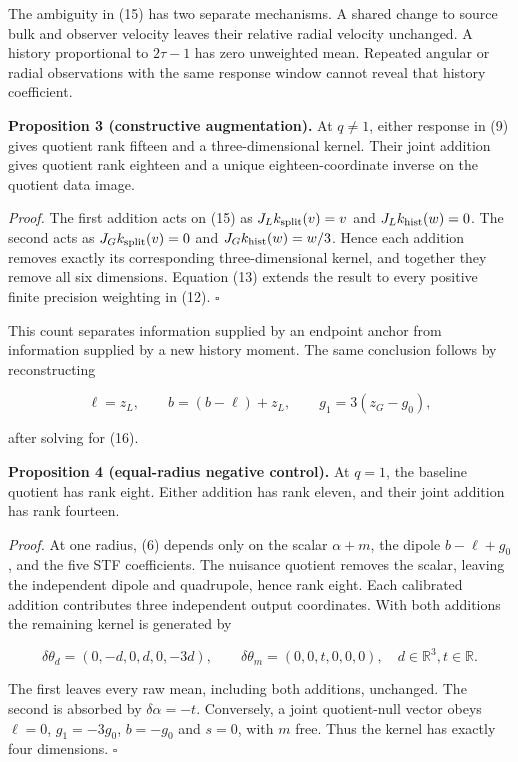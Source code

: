 The ambiguity in (15) has two separate mechanisms. A shared change to source bulk and observer velocity leaves their relative radial velocity unchanged. A history proportional to \(2\tau-1\) has zero unweighted mean. Repeated angular or radial observations with the same response window cannot reveal that history coefficient.

\textbf{Proposition 3 (constructive augmentation).} At \(q\ne1\), either response in (9) gives quotient rank fifteen and a three-dimensional kernel. Their joint addition gives quotient rank eighteen and a unique eighteen-coordinate inverse on the quotient data image.

\emph{Proof.} The first addition acts on (15) as \(J_Lk_{\rm split}(v)=v\) and \(J_Lk_{\rm hist}(w)=0\). The second acts as \(J_Gk_{\rm split}(v)=0\) and \(J_Gk_{\rm hist}(w)=w/3\). Hence each addition removes exactly its corresponding three-dimensional kernel, and together they remove all six dimensions. Equation (13) extends the result to every positive finite precision weighting in (12). \(\square\)

This count separates information supplied by an endpoint anchor from information supplied by a new history moment. The same conclusion follows by reconstructing

\[
\ell=z_L,\qquad b=(b-\ell)+z_L,\qquad
g_1=3(z_G-g_0),                                         \tag{17}
\]

after solving for (16).

\textbf{Proposition 4 (equal-radius negative control).} At \(q=1\), the baseline quotient has rank eight. Either addition has rank eleven, and their joint addition has rank fourteen.

\emph{Proof.} At one radius, (6) depends only on the scalar \(\alpha+m\), the dipole \(b-\ell+g_0\), and the five STF coefficients. The nuisance quotient removes the scalar, leaving the independent dipole and quadrupole, hence rank eight. Each calibrated addition contributes three independent output coordinates. With both additions the remaining kernel is generated by

\[
\delta\theta_d=(0,-d,0,d,0,-3d),\qquad
\delta\theta_m=(0,0,t,0,0,0),\quad d\in\mathbb R^3, t\in\mathbb R.
                                                               \tag{18}
\]

The first leaves every raw mean, including both additions, unchanged. The second is absorbed by \(\delta\alpha=-t\). Conversely, a joint quotient-null vector obeys \(\ell=0\), \(g_1=-3g_0\), \(b=-g_0\) and \(s=0\), with \(m\) free. Thus the kernel has exactly four dimensions. \(\square\)

